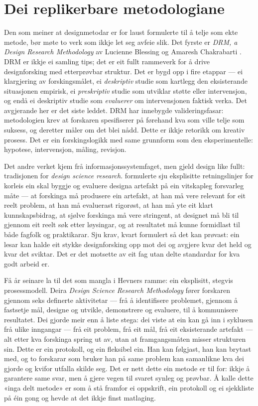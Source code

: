 \section{Dei replikerbare metodologiane}

Den som meiner at designmetodar er for laust formulerte til å telje som ekte metode, bør møte to verk som ikkje let seg avfeie slik. Det fyrste er \textit{DRM, a Design Research Methodology} av Lucienne Blessing og Amaresh Chakrabarti \autocite{blessing2009drm}. DRM er ikkje ei samling tips; det er eit fullt rammeverk for å drive designforsking med etterprøvbar struktur. Det er bygd opp i fire etappar — ei klargjering av forskingsmålet, ei \emph{deskriptiv} studie som kartlegg den eksisterande situasjonen empirisk, ei \emph{preskriptiv} studie som utviklar støtte eller intervensjon, og endå ei deskriptiv studie som \emph{evaluerer} om intervensjonen faktisk verka. Det avgjerande her er det siste leddet. DRM har innebygde valideringsfasar: metodologien krev at forskaren spesifiserer på førehand kva som ville telje som suksess, og deretter måler om det blei nådd. Dette er ikkje retorikk om kreativ prosess. Det er ein forskingslogikk med same grunnform som den eksperimentelle: hypotese, intervensjon, måling, revisjon.

Det andre verket kjem frå informasjonssystemfaget, men gjeld design like fullt: tradisjonen for \emph{design science research}. \textcite{hevner2004dsr} formulerte sju eksplisitte retningslinjer for korleis ein skal byggje og evaluere designa artefakt på ein vitskapleg forsvarleg måte — at forskinga må produsere ein artefakt, at han må vere relevant for eit reelt problem, at han må evaluerast rigorøst, at han må yte eit klart kunnskapsbidrag, at sjølve forskinga må vere stringent, at designet må bli til gjennom eit reelt søk etter løysingar, og at resultatet må kunne formidlast til både fagfolk og praktikarar. Sju krav, kvart formulert så det kan prøvast: ein lesar kan halde eit stykke designforsking opp mot dei og avgjere kvar det held og kvar det sviktar. Det er det motsette av eit fag utan delte standardar for kva godt arbeid er.

Få år seinare la \textcite{peffers2007dsrm} til det som mangla i Hevners ramme: ein eksplisitt, stegvis prosessmodell. Deira \textit{Design Science Research Methodology} fører forskaren gjennom seks definerte aktivitetar — frå å identifisere problemet, gjennom å fastsetje mål, designe og utvikle, demonstrere og evaluere, til å kommunisere resultatet. Dei gjorde meir enn å liste stega: dei viste at ein kan gå inn i syklusen frå ulike inngangar — frå eit problem, frå eit mål, frå eit eksisterande artefakt — alt etter kva forskinga spring ut av, utan at framgangsmåten misser strukturen sin. Dette er ein protokoll, og ein fleksibel ein. Han kan følgjast, han kan brytast med, og to forskarar som bruker han på same problem kan samanlikne kva dei gjorde og kvifor utfalla skilde seg. Det er nett dette ein metode er til for: ikkje å garantere same svar, men å gjere vegen til svaret synleg og prøvbar. Å kalle dette «inga delt metode» er som å stå framfor ei oppskrift, ein protokoll og ei sjekkliste på éin gong og hevde at det ikkje finst matlaging.

